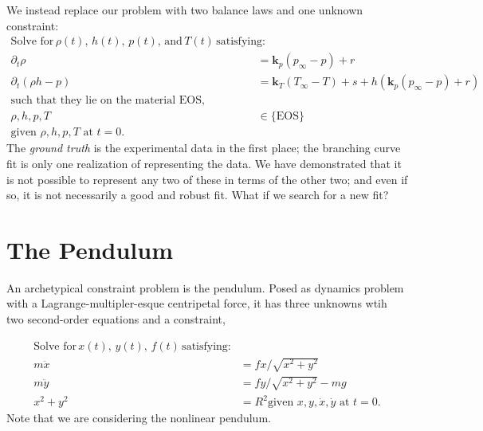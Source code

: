\documentclass[AMA,STIX1COL]{WileyNJD-v2}
\begin{document}
We instead replace our problem with two balance laws and one unknown
constraint:
\begin{align}
\text{Solve for}\, \rho(t), \, h(t), \, p(t),\, \text{and}\, T(t)\,
  \text{satisfying:} \nonumber
                       \\
\partial_t \rho &  = \mathbf{k}_p(p_\infty - p) + r\\
\partial_t (\rho h-p) & = \mathbf{k}_T(T_\infty-T)  + s + h\left(\mathbf{k}_p(p_\infty - p) + r\right) \\
\text{such that they lie on the material EOS,}\nonumber
                                                \\
  \rho,h,p,T & \in \{\text{EOS}\}\\
  \text{given }\rho,h,p,T \text{ at } t=0. \nonumber
\end{align}
The \emph{ground truth} is the experimental data in the first place; the
branching curve fit is only one realization of representing the data. We
have demonstrated that it is not possible to represent any two of these
in terms of the other two; and even if so, it is not necessarily a good
and robust fit. What if we search for a new fit?

\hypertarget{header-n3267}{%
\section{The Pendulum}\label{header-n3267}}

An archetypical constraint problem is the pendulum. Posed as dynamics
problem with a Lagrange-multipler-esque centripetal force, it
has three unknowns wtih two second-order equations and a constraint,

\begin{align}
\text{Solve for}\, x(t), \, y(t), \, f(t) \, \text{satisfying:} \nonumber \\
m \ddot{x} & = f x/\sqrt{x^2+y^2} \\
m \ddot{y} & = f y/\sqrt{x^2+y^2} - m g \\
  x^2 + y^2 & = R^2
  \text{given } x,y, \dot{x},\dot{y} \text{ at } t=0. \nonumber
\end{align}
Note that we are considering the nonlinear pendulum.
\end{document}
